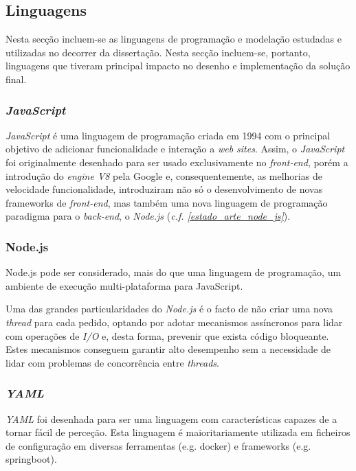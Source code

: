 \subsection{Linguagens}
Nesta secção incluem-se as linguagens de programação e modelação estudadas e utilizadas no decorrer da dissertação. Nesta secção incluem-se, portanto, linguagens que tiveram principal impacto no desenho e implementação da solução final.

\subsubsection{\emph{JavaScript} \label{estado_arte_javascript}}

\emph{JavaScript} é uma linguagem de programação criada em 1994 com o principal objetivo de adicionar funcionalidade e interação a \emph{web sites}. Assim, o \emph{JavaScript} foi originalmente desenhado para ser usado exclusivamente no \emph{front-end}, porém a introdução do \emph{engine V8} pela Google e, consequentemente, as melhorias de velocidade funcionalidade, introduziram não só o desenvolvimento de novas frameworks de \emph{front-end}, mas também uma nova linguagem de programação paradigma para o \emph{back-end}, o \emph{Node.js} (\emph{c.f. \ref{estado_arte_node_js}})\cite{javascript}.

\subsubsection{Node.js \label{estado_arte_node_js}}
Node.js pode ser considerado, mais do que uma linguagem de programação, um ambiente de execução multi-plataforma para JavaScript\cite{node_js}.

Uma das grandes particularidades do \emph{Node.js} é o facto de não criar uma nova \emph{thread} para cada pedido, optando por adotar mecanismos assíncronos para lidar com operações de \emph{I/O} e, desta forma, prevenir que exista código bloqueante. Estes mecanismos conseguem garantir alto desempenho sem a necessidade de lidar com problemas de concorrência entre \emph{threads}\cite{node_js}.

\subsubsection{\emph{\acrfull{YAML}}}
\emph{\acrshort{YAML}} foi desenhada para ser uma linguagem com características capazes de a tornar fácil de perceção. Esta linguagem é maioritariamente utilizada em ficheiros de configuração em diversas ferramentas (e.g. docker) e frameworks (e.g. springboot)\cite{yaml}.

